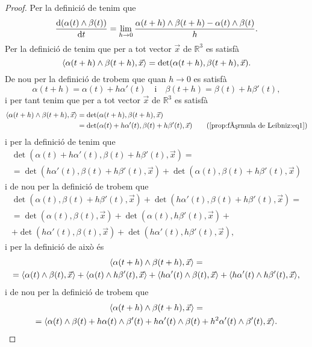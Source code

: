 \documentclass[../Apunts.tex]{subfiles}
\begin{document}
	\begin{proof}
		Per la definició de  tenim que
		\begin{equation}
			\label{prop:fórmula de Leibniz:eq2}
			\frac{\mathop{}\!\mathrm{d}(\alpha(t)\mathbin{\wedge}\beta(t))}{\mathop{}\!\mathrm{d} t}=\lim_{h\to0}\frac{\alpha(t+h)\mathbin{\wedge}\beta(t+h)-\alpha(t)\mathbin{\wedge}\beta(t)}{h}.
		\end{equation}
		Per la definició de  tenim que per a tot vector \(\vec{x}\) de \(\mathbb{R}^{3}\) es satisfà
		\[\prodesc{\alpha(t+h)\prodvec\beta(t+h)}{\vec{x}}=\det(\alpha(t+h),\beta(t+h),\vec{x}).\]
		De nou per la definició de  trobem que quan \(h\to0\) es satisfà
		\begin{equation}
			\label{prop:fórmula de Leibniz:eq1}
			\alpha(t+h)=\alpha(t)+h\alpha'(t)\quad\text{i}\quad\beta(t+h)=\beta(t)+h\beta'(t),
		\end{equation}
		i per tant tenim que per a tot vector \(\vec{x}\) de \(\mathbb{R}^{3}\) es satisfà
		\begin{align*}
			\prodesc{\alpha(t+h)\prodvec\beta(t+h)}{\vec{x}}&=\det(\alpha(t+h),\beta(t+h),\vec{x}) \\
			&=\det(\alpha(t)+h\alpha'(t),\beta(t)+h\beta'(t),\vec{x}) \tag{\ref{prop:fórmula de Leibniz:eq1}}
		\end{align*}
		i per la definició de  tenim que
		\begin{multline*}
			\det(\alpha(t)+h\alpha'(t),\beta(t)+h\beta'(t),\vec{x})=\\
			=\det(h\alpha'(t),\beta(t)+h\beta'(t),\vec{x})+\det(\alpha(t),\beta(t)+h\beta'(t),\vec{x})
		\end{multline*}
		i de nou per la definició de  trobem que
		\begin{multline*}
			\det(\alpha(t),\beta(t)+h\beta'(t),\vec{x})+\det(h\alpha'(t),\beta(t)+h\beta'(t),\vec{x})=\\
			=\det(\alpha(t),\beta(t),\vec{x})+\det(\alpha(t),h\beta'(t),\vec{x})+\\
			+\det(h\alpha'(t),\beta(t),\vec{x})+\det(h\alpha'(t),h\beta'(t),\vec{x}),
		\end{multline*}
		i per la definició de  això és
		\begin{multline*}
			\prodesc{\alpha(t+h)\prodvec\beta(t+h)}{\vec{x}}=\\
			=\prodesc{\alpha(t)\prodvec\beta(t)}{\vec{x}}+\prodesc{\alpha(t)\prodvec h\beta'(t)}{\vec{x}}+\prodesc{h\alpha'(t)\prodvec\beta(t)}{\vec{x}}+\prodesc{h\alpha'(t)\prodvec h\beta'(t)}{\vec{x}},
		\end{multline*}
		i de nou per la definició de  trobem que
		\begin{multline*}
			\prodesc{\alpha(t+h)\prodvec\beta(t+h)}{\vec{x}}=\\
			=\prodesc{\alpha(t)\prodvec\beta(t)+h\alpha(t)\prodvec\beta'(t)+h\alpha'(t)\prodvec\beta(t)+h^{2}\alpha'(t)\prodvec \beta'(t)}{\vec{x}}.
		\end{multline*}
		

\end{proof}
\end{document}
